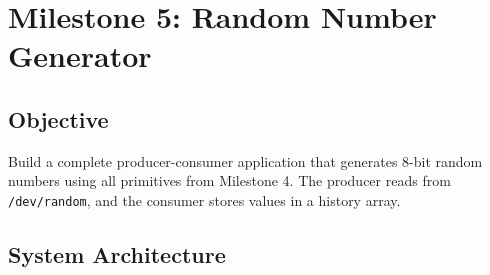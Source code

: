 \documentclass[12pt,a4paper]{article}
\begin{document}
\clearpage

\section{Milestone 5: Random Number Generator}

\subsection{Objective}
Build a complete producer-consumer application that generates 8-bit random numbers using all primitives from Milestone 4. The producer reads from \texttt{/dev/random}, and the consumer stores values in a history array.

\subsection{System Architecture}
\end{document}
